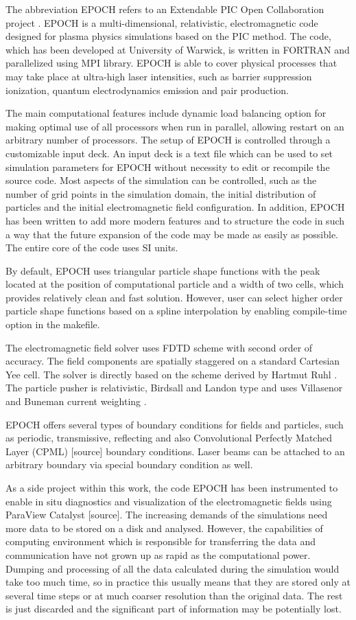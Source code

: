 The abbreviation EPOCH refers to an Extendable PIC Open Collaboration project \cite{bennett}. EPOCH is a multi-dimensional, relativistic, electromagnetic code designed for plasma physics simulations based on the PIC method. The code, which has been developed at University of Warwick, is written in FORTRAN and parallelized using MPI library. EPOCH is able to cover physical processes that may take place at ultra-high laser intensities, such as barrier suppression ionization, quantum electrodynamics emission and pair production.

The main computational features include dynamic load balancing option for making optimal use of all processors when run in parallel, allowing restart on an arbitrary number of processors. The setup of EPOCH is controlled through a customizable input deck. An input deck is a text file which can be used to set simulation parameters for EPOCH without necessity to edit or recompile the source code. Most aspects of the simulation can be controlled, such as the number of grid points in the simulation domain, the initial distribution of particles and the initial electromagnetic field configuration. In addition, EPOCH has been written to add more modern features and to structure the code in such a way that the future expansion of the code may be made as easily as possible. The entire core of the code uses SI units.

By default, EPOCH uses triangular particle shape functions with the peak located at the position of computational particle and a width of two cells, which provides relatively clean and fast solution. However, user can select higher order particle shape functions based on a spline interpolation by enabling compile-time option in the makefile.

The electromagnetic field solver uses FDTD scheme with second order of accuracy. The field components are spatially staggered on a standard Cartesian Yee cell. The solver is directly based on the scheme derived by Hartmut Ruhl \cite{ruhl}. The particle pusher is relativistic, Birdsall and Landon type \cite{birdsall} and uses Villasenor and Buneman current weighting \cite{villasenor}.

EPOCH offers several types of boundary conditions for fields and particles, such as periodic, transmissive, reflecting and also Convolutional Perfectly Matched Layer (CPML) [source] boundary conditions. Laser beams can be attached to an arbitrary boundary via special boundary condition as well.

As a side project within this work, the code EPOCH has been instrumented to enable in situ diagnostics and visualization of the electromagnetic fields using ParaView Catalyst [source].
The increasing demands of the simulations need more data to be stored on a disk and analysed. However, the capabilities of computing environment which is responsible for transferring the data and communication have not grown up as rapid as the computational power. Dumping and processing of all the data calculated during the simulation would take too much time, so in practice this usually means that they are stored only at several time steps or at much coarser resolution than the original data. The rest is just discarded and the significant part of information may be potentially lost.

